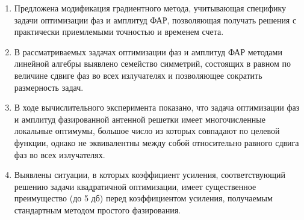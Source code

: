 \begin{enumerate}
\item Предложена модификация градиентного метода, учитывающая специфику задачи оптимизации фаз и амплитуд ФАР, позволяющая получать решения с практически приемлемыми точностью и временем счета. 
  \item В рассматриваемых задачах оптимизации фаз и амплитуд ФАР методами линейной алгебры выявлено семейство  симметрий, состоящих в равном по величине сдвиге фаз во всех излучателях и позволяющее сократить размерность задач.
  \item В ходе вычислительного эксперимента показано, что задача оптимизации фаз и амплитуд фазированной антенной решетки имеет многочисленные локальные оптимумы, большое число из которых совпадают по целевой функции, однако не эквивалентны между собой относительно равного сдвига фаз во всех излучателях.
  \item Выявлены ситуации, в которых коэффициент усиления, соответствующий решению задачи квадратичной оптимизации, имеет существенное преимущество (до 5 дб) перед коэффициентом усиления, получаемым стандартным методом простого фазирования. 
\end{enumerate}
